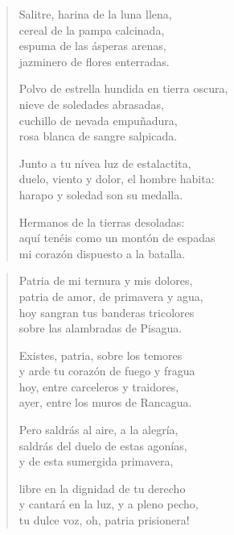 \documentclass[12pt]{article}
\begin{document}
\clearpage
{}
\begin{verse}

Salitre, harina de la luna llena,\\
cereal de la pampa calcinada,\\
espuma de las ásperas arenas,\\
jazminero de flores enterradas.  

Polvo de estrella hundida en tierra oscura,\\
nieve de soledades abrasadas,\\
cuchillo de nevada empuñadura,\\
rosa blanca de sangre salpicada.  

Junto a tu nívea luz de estalactita,\\
duelo, viento y dolor, el hombre habita:\\
harapo y soledad son su medalla.  

Hermanos de la tierras desoladas:\\
aquí tenéis como un montón de espadas\\
mi corazón dispuesto a la batalla.  

\end{verse}

\clearpage
{}
\begin{verse}

Patria de mi ternura y mis dolores,\\
patria de amor, de primavera y agua,\\
hoy sangran tus banderas tricolores\\
sobre las alambradas de Pisagua.  

Existes, patria, sobre los temores\\
y arde tu corazón de fuego y fragua\\
hoy, entre carceleros y traidores,\\
ayer, entre los muros de Rancagua.  

Pero saldrás al aire, a la alegría,\\
saldrás del duelo de estas agonías,\\
y de esta sumergida primavera,  

libre en la dignidad de tu derecho\\
y cantará en la luz, y a pleno pecho,\\
tu dulce voz, oh, patria prisionera!  

\end{verse}
\end{document}
